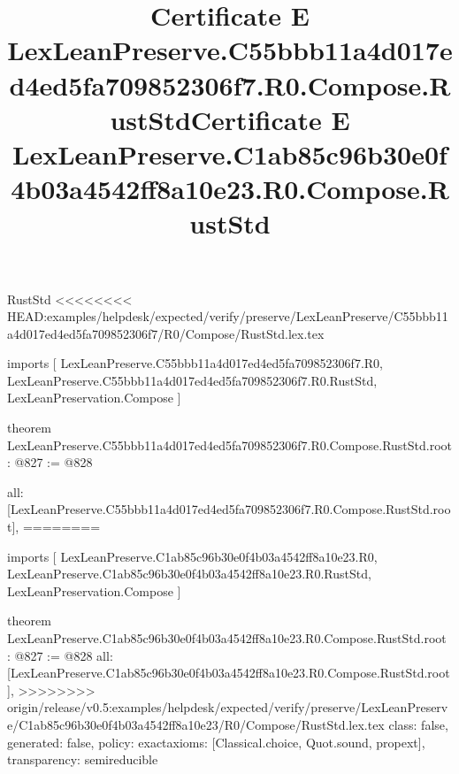 \begin{lexlean}{RustStd}
<<<<<<<< HEAD:examples/helpdesk/expected/verify/preserve/LexLeanPreserve/C55bbb11a4d017ed4ed5fa709852306f7/R0/Compose/RustStd.lex.tex
\title{Certificate E LexLeanPreserve.C55bbb11a4d017ed4ed5fa709852306f7.R0.Compose.RustStd}
\begin{coremodule}
imports [
  LexLeanPreserve.C55bbb11a4d017ed4ed5fa709852306f7.R0,
  LexLeanPreserve.C55bbb11a4d017ed4ed5fa709852306f7.R0.RustStd,
  LexLeanPreservation.Compose
]

theorem LexLeanPreserve.C55bbb11a4d017ed4ed5fa709852306f7.R0.Compose.RustStd.root : @827 := @828 {
  all: [LexLeanPreserve.C55bbb11a4d017ed4ed5fa709852306f7.R0.Compose.RustStd.root],
========
\title{Certificate E LexLeanPreserve.C1ab85c96b30e0f4b03a4542ff8a10e23.R0.Compose.RustStd}
\begin{coremodule}
imports [
  LexLeanPreserve.C1ab85c96b30e0f4b03a4542ff8a10e23.R0,
  LexLeanPreserve.C1ab85c96b30e0f4b03a4542ff8a10e23.R0.RustStd,
  LexLeanPreservation.Compose
]

theorem LexLeanPreserve.C1ab85c96b30e0f4b03a4542ff8a10e23.R0.Compose.RustStd.root : @827 := @828 {
  all: [LexLeanPreserve.C1ab85c96b30e0f4b03a4542ff8a10e23.R0.Compose.RustStd.root],
>>>>>>>> origin/release/v0.5:examples/helpdesk/expected/verify/preserve/LexLeanPreserve/C1ab85c96b30e0f4b03a4542ff8a10e23/R0/Compose/RustStd.lex.tex
  class: false,
  generated: false,
  policy: exact{axioms: [Classical.choice, Quot.sound, propext]},
  transparency: semireducible
}


\end{coremodule}}
\end{coremodule}
\end{lexlean}
